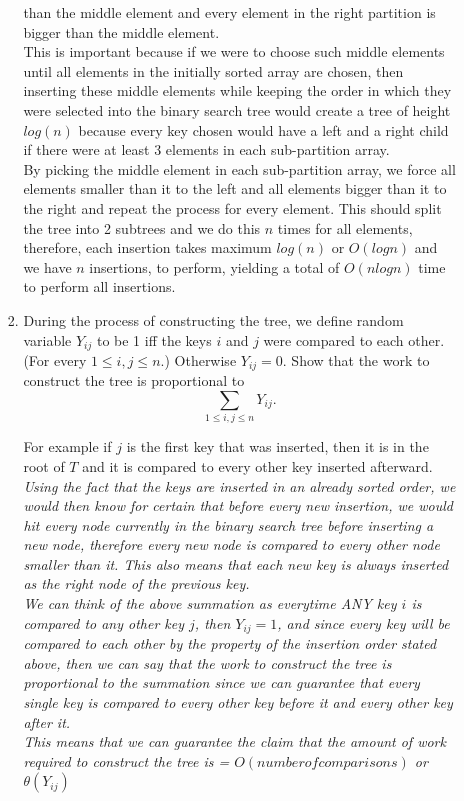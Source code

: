 \documentclass[11pt,epic,leqno,eepic,psfig,]{article}
\newcommand{\ans}[1]{{\color{brown}{\bf\Large Answer:} \sl  #1 \color{black}}}
\renewcommand{\i}{\item}
\begin{document}
\begin{enumerate}
\begin{enumerate}
\begin{enumerate}
{than the middle element and every element in the right partition is bigger than the middle element.
\\ This is important because if we were to choose such middle elements until all elements in the initially sorted array are chosen, then inserting these middle elements while keeping the order
in which they were selected into the binary search tree would create a tree of height $log(n)$ because every key chosen would have a left and a right child if there were at least 3 elements
in each sub-partition array.
\\ By picking the middle element in each sub-partition array, we force all elements smaller than it to the left and all elements bigger than it to the right and repeat the process for every element. This should split the tree into 2 subtrees and we do this $n$ times for all elements, therefore, each insertion takes maximum $log(n)$ or $O(log n)$ and we have $n$ insertions, to
perform, yielding a total of $O(n log n)$ time to perform all insertions.}
    \i  During the process of constructing the tree, we define random variable $Y_{ij}$ to be 1 iff the keys $i$ and $j$ were compared to each other. (For every $1\leq i, j\leq n.$)
    Otherwise $Y_{ij}=0.$ Show that the work to construct the tree is proportional to
    $$\sum_{1\leq i,j\leq n} Y_{ij}.$$

    For example if $j$ is the first key that was inserted, then it is in the root of $T$ and it is compared to every other key inserted afterward.
\\\ans{Using the fact that the keys are inserted in an already sorted order, we would then know for certain that before every new insertion, we would hit every node currently in the
binary search tree before inserting a new node, therefore every new node is compared to every other node smaller than it. This also means that each new key is always inserted as the right node of the previous key.
\\ We can think of the above summation as everytime ANY key $i$ is compared to any other key $j$, then $Y_{ij} = 1$, and since every key will be compared to each other by the property of the insertion order stated above, then we can say that the work to construct the tree is proportional to the summation since we can guarantee that every single key is compared to every other key before it and every other key after it.
\\ This means that we can guarantee the claim that the amount of work required to construct the tree is = $O(number of comparisons)$ or $\theta(Y_{ij})$}


\end{enumerate}
\end{enumerate}
\end{enumerate}
\end{document}
